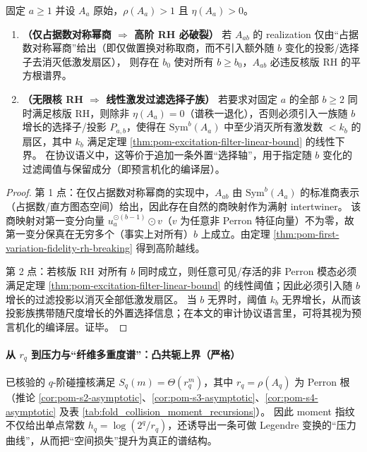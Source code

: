 \begin{theorem}[仅占据数对称幂商 \texorpdfstring{$\Rightarrow$}{=>} 高阶 RH 必破裂；无限核 RH \texorpdfstring{$\Rightarrow$}{=>} 线性激发过滤选择子族]\label{thm:pom-occupancy-symquotient-rh-obstruction}
固定 \(a\ge 1\) 并设 \(A_a\) 原始，\(\rho(A_a)>1\) 且 \(\eta(A_a)>0\)。
\begin{enumerate}
  \item \textbf{（仅占据数对称幂商 \(\Rightarrow\) 高阶 RH 必破裂）}
  若 \(A_{ab}\) 的 realization 仅由“占据数对称幂商”给出（即仅做置换对称取商，而不引入额外随 \(b\) 变化的投影/选择子去消灭低激发扇区），
  则存在 \(b_0\) 使对所有 \(b\ge b_0\)，\(A_{ab}\) 必违反核版 RH 的平方根谱界。
  \item \textbf{（无限核 RH \(\Rightarrow\) 线性激发过滤选择子族）}
  若要求对固定 \(a\) 的全部 \(b\ge 2\) 同时满足核版 RH，则除非 \(\eta(A_a)=0\)（谱秩一退化），否则必须引入一族随 \(b\) 增长的选择子/投影 \(P_{a,b}\)，使得在 \(\mathrm{Sym}^b(A_a)\) 中至少消灭所有激发数 \(<k_b\) 的扇区，其中 \(k_b\) 满足定理 \ref{thm:pom-excitation-filter-linear-bound} 的线性下界。
  在协议语义中，这等价于追加一条外置“选择轴”，用于指定随 \(b\) 变化的过滤阈值与保留成分（即预言机化的编译层）。
\end{enumerate}
\end{theorem}
\begin{proof}
第 1 点：在仅占据数对称幂商的实现中，\(A_{ab}\) 由 \(\mathrm{Sym}^b(A_a)\) 的标准商表示（占据数/直方图态空间）给出，因此存在自然的商映射作为满射 intertwiner。
该商映射对第一变分向量 \(u_a^{\odot(b-1)}\odot v\)（\(v\) 为任意非 Perron 特征向量）不为零，故第一变分保真在无穷多个（事实上对所有）\(b\) 上成立。由定理 \ref{thm:pom-first-variation-fidelity-rh-breaking} 得到高阶越线。
\par
第 2 点：若核版 RH 对所有 \(b\) 同时成立，则任意可见/存活的非 Perron 模态必须满足定理 \ref{thm:pom-excitation-filter-linear-bound} 的线性阈值；因此必须引入随 \(b\) 增长的过滤投影以消灭全部低激发扇区。
当 \(b\) 无界时，阈值 \(k_b\) 无界增长，从而该投影族携带随尺度增长的外置选择信息；在本文的审计协议语言里，可将其视为预言机化的编译层。证毕。
\end{proof}

\paragraph{从 \texorpdfstring{$r_q$}{r\_q} 到压力与“纤维多重度谱”：凸共轭上界（严格）}
已核验的 \(q\)-阶碰撞核满足 \(S_q(m)=\Theta(r_q^m)\)，其中 \(r_q=\rho(A_q)\) 为 Perron 根（推论 \ref{cor:pom-s2-asymptotic}、\ref{cor:pom-s3-asymptotic}、\ref{cor:pom-s4-asymptotic} 及表 \ref{tab:fold_collision_moment_recursions}）。
因此 moment 指纹不仅给出单点常数 \(h_q=\log(2^q/r_q)\)，还诱导出一条可做 Legendre 变换的“压力曲线”，从而把“空间损失”提升为真正的谱结构。

